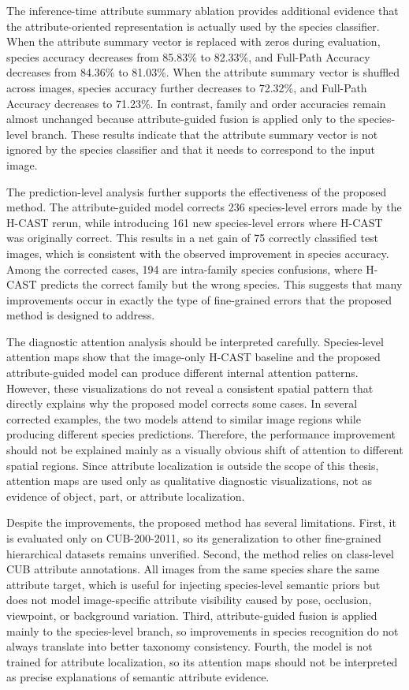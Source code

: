 The inference-time attribute summary ablation provides additional evidence that the attribute-oriented representation is actually used by the species classifier. When the attribute summary vector is replaced with zeros during evaluation, species accuracy decreases from 85.83\% to 82.33\%, and Full-Path Accuracy decreases from 84.36\% to 81.03\%. When the attribute summary vector is shuffled across images, species accuracy further decreases to 72.32\%, and Full-Path Accuracy decreases to 71.23\%. In contrast, family and order accuracies remain almost unchanged because attribute-guided fusion is applied only to the species-level branch. These results indicate that the attribute summary vector is not ignored by the species classifier and that it needs to correspond to the input image.

The prediction-level analysis further supports the effectiveness of the proposed method. The attribute-guided model corrects 236 species-level errors made by the H-CAST rerun, while introducing 161 new species-level errors where H-CAST was originally correct. This results in a net gain of 75 correctly classified test images, which is consistent with the observed improvement in species accuracy. Among the corrected cases, 194 are intra-family species confusions, where H-CAST predicts the correct family but the wrong species. This suggests that many improvements occur in exactly the type of fine-grained errors that the proposed method is designed to address.

The diagnostic attention analysis should be interpreted carefully. Species-level attention maps show that the image-only H-CAST baseline and the proposed attribute-guided model can produce different internal attention patterns. However, these visualizations do not reveal a consistent spatial pattern that directly explains why the proposed model corrects some cases. In several corrected examples, the two models attend to similar image regions while producing different species predictions. Therefore, the performance improvement should not be explained mainly as a visually obvious shift of attention to different spatial regions. Since attribute localization is outside the scope of this thesis, attention maps are used only as qualitative diagnostic visualizations, not as evidence of object, part, or attribute localization.

Despite the improvements, the proposed method has several limitations. First, it is evaluated only on CUB-200-2011, so its generalization to other fine-grained hierarchical datasets remains unverified. Second, the method relies on class-level CUB attribute annotations. All images from the same species share the same attribute target, which is useful for injecting species-level semantic priors but does not model image-specific attribute visibility caused by pose, occlusion, viewpoint, or background variation. Third, attribute-guided fusion is applied mainly to the species-level branch, so improvements in species recognition do not always translate into better taxonomy consistency. Fourth, the model is not trained for attribute localization, so its attention maps should not be interpreted as precise explanations of semantic attribute evidence.

